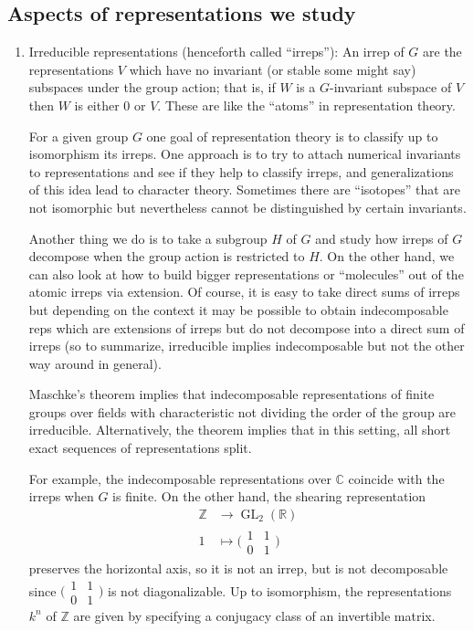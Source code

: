 \documentclass[11pt,leqno]{article}
\theoremstyle{plain}
\theoremstyle{definition}
\numberwithin{equation}{section}
\numberwithin{lem}{section}
\DeclareMathOperator{\GL}{GL}
\begin{document}
\subsection{Aspects of representations we study}
\begin{enumerate}
    \item Irreducible representations (henceforth called ``irreps''): An irrep of $G$ are the representations $V$ which have no invariant (or stable some might say) subspaces under the group action; that is, if $W$ is a $G$-invariant subspace of $V$ then $W$ is either $0$ or $V$. These are like the ``atoms'' in representation theory.
    
    For a given group $G$ one goal of representation theory is to classify up to isomorphism its irreps. One approach is to try to attach numerical invariants to representations and see if they help to classify irreps, and generalizations of this idea lead to character theory. Sometimes there are ``isotopes'' that are not isomorphic but nevertheless cannot be distinguished by certain invariants.

    Another thing we do is to take a subgroup $H$ of $G$ and study how irreps of $G$ decompose when the group action is restricted to $H$. On the other hand, we can also look at how to build bigger representations or ``molecules'' out of the atomic irreps via extension. Of course, it is easy to take direct sums of irreps but depending on the context it may be possible to obtain indecomposable reps which are extensions of irreps but do not decompose into a direct sum of irreps (so to summarize, irreducible implies indecomposable but not the other way around in general).

    Maschke's theorem implies that indecomposable representations of finite groups over fields with characteristic not dividing the order of the group are irreducible. Alternatively, the theorem implies that in this setting, all short exact sequences of representations split.
    
    For example, the indecomposable representations over $\mathbb C$ coincide with the irreps when $G$ is finite. On the other hand, the shearing representation 
    \begin{align*}
      \mathbb Z &\to \GL_2(\mathbb R)\\
      1 &\mapsto \big(\!\begin{smallmatrix}
        1 & 1 \\ 0 & 1
      \end{smallmatrix}\!\big)
    \end{align*}
    preserves the horizontal axis, so it is not an irrep, but is not decomposable since $\big(\!\begin{smallmatrix}
        1 & 1 \\ 0 & 1
    \end{smallmatrix}\!\big)$ is not diagonalizable. Up to isomorphism, the representations $k^n$ of $\mathbb Z$ are given by specifying a conjugacy class of an invertible matrix.

\end{enumerate}
\end{document}
